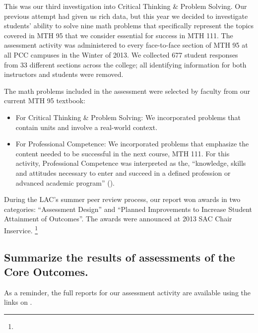 \begin{description}
	      This was our third investigation into Critical Thinking \& Problem Solving.
	      Our previous attempt had given us rich data, but this year we decided to investigate students' ability to solve nine math problems that specifically represent the topics covered in MTH 95 that we consider essential for success in MTH 111.
	      The assessment activity was administered to every face-to-face section of MTH 95 at all PCC campuses in the Winter of 2013.
	      We collected 677 student responses from 33 different sections across the college; all identifying information for both instructors and students were removed.

	      The math problems included in the assessment were selected by faculty from our current MTH 95 textbook:
	      \begin{itemize}
		      \item For Critical Thinking \& Problem Solving: We incorporated problems that contain units and involve a real-world context.
		      \item For Professional Competence:  We incorporated problems that emphasize the content needed to be successful in the next course, MTH 111.
		            For this activity, Professional Competence was interpreted as the, ``knowledge, skills and attitudes necessary to enter and succeed in a defined profession or advanced academic program'' (\cite{coreoutcomes}).
	      \end{itemize}
	      During the LAC's summer peer review process, our report won awards in two categories: ``Assessment Design'' and ``Planned Improvements to Increase Student Attainment of Outcomes''.
	      The awards were announced at 2013 SAC Chair Inservice.
	      \footnote{\awardsurl}
\end{description}

\subsection[Core Outcome assessment results]{Summarize the results of assessments of the Core Outcomes.}
As a reminder, the full reports for our assessment activity are available using the links on .

